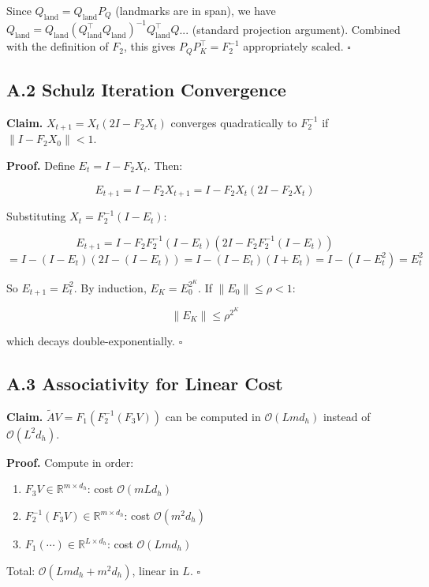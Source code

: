 Since $Q_\text{land} = Q_\text{land} P_Q$ (landmarks are in span), we have 
$Q_\text{land} = Q_\text{land} (Q_\text{land}^\top Q_\text{land})^{-1} Q_\text{land}^\top Q$... 
(standard projection argument). Combined with the definition of $F_2$, this 
gives $P_Q P_K^\top = F_2^{-1}$ appropriately scaled. $\square$

\subsection{A.2 Schulz Iteration Convergence}

\textbf{Claim.} $X_{t+1} = X_t (2I - F_2 X_t)$ converges quadratically to $F_2^{-1}$ 
if $\|I - F_2 X_0\| < 1$.

\textbf{Proof.} Define $E_t = I - F_2 X_t$. Then:

\[
E_{t+1} = I - F_2 X_{t+1} = I - F_2 X_t (2I - F_2 X_t)
\]

Substituting $X_t = F_2^{-1}(I - E_t)$:

\[
E_{t+1} = I - F_2 F_2^{-1}(I - E_t) (2I - F_2 F_2^{-1}(I - E_t))
\]
\[
= I - (I - E_t)(2I - (I - E_t)) = I - (I - E_t)(I + E_t) = I - (I - E_t^2) = E_t^2
\]

So $E_{t+1} = E_t^2$. By induction, $E_K = E_0^{2^K}$. If $\|E_0\| \le \rho < 1$:

\[
\|E_K\| \le \rho^{2^K}
\]

which decays double-exponentially. $\square$

\subsection{A.3 Associativity for Linear Cost}

\textbf{Claim.} $\tilde{A} V = F_1 (F_2^{-1} (F_3 V))$ can be computed in 
$\mathcal{O}(L m d_h)$ instead of $\mathcal{O}(L^2 d_h)$.

\textbf{Proof.} Compute in order:

\begin{enumerate}
\item $F_3 V \in \mathbb{R}^{m \times d_h}$: cost $\mathcal{O}(m L d_h)$
\item $F_2^{-1} (F_3 V) \in \mathbb{R}^{m \times d_h}$: cost $\mathcal{O}(m^2 d_h)$
\item $F_1 (\cdots) \in \mathbb{R}^{L \times d_h}$: cost $\mathcal{O}(L m d_h)$

\end{enumerate}
Total: $\mathcal{O}(L m d_h + m^2 d_h)$, linear in $L$. $\square$

